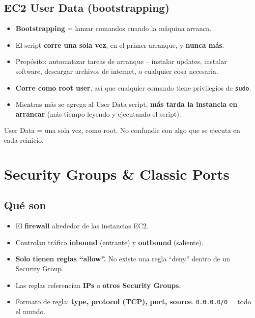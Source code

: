 \documentclass[11pt,a4paper]{article}
\let\oldsection\section
\renewcommand{\section}{\Needspace{9\baselineskip}\oldsection}
\let\oldsubsection\subsection
\renewcommand{\subsection}{\Needspace{6\baselineskip}\oldsubsection}
\newcommand{\cmd}[1]{\texttt{#1}}
\begin{document}
\subsection{EC2 User Data (bootstrapping)}
\begin{itemize}
  \item \textbf{Bootstrapping} = lanzar comandos cuando la máquina arranca.
  \item El script \textbf{corre una sola vez}, en el primer arranque, y \textbf{nunca más}.
  \item Propósito: automatizar tareas de arranque -- instalar updates, instalar software, descargar archivos de internet, o cualquier cosa necesaria.
  \item \textbf{Corre como root user}, así que cualquier comando tiene privilegios de \cmd{sudo}.
  \item Mientras más se agrega al User Data script, \textbf{más tarda la instancia en arrancar} (más tiempo leyendo y ejecutando el script).
\end{itemize}

\begin{truco}[title=Regla rápida]
User Data = una sola vez, como root. No confundir con algo que se ejecuta en cada reinicio.
\end{truco}

\section{Security Groups \& Classic Ports}

\subsection{Qué son}
\begin{itemize}
  \item El \textbf{firewall} alrededor de las instancias EC2.
  \item Controlan tráfico \textbf{inbound} (entrante) y \textbf{outbound} (saliente).
  \item \textbf{Solo tienen reglas ``allow''.} No existe una regla ``deny'' dentro de un Security Group.
  \item Las reglas referencian \textbf{IPs} o \textbf{otros Security Groups}.
  \item Formato de regla: \textbf{type, protocol (TCP), port, source}. \cmd{0.0.0.0/0} = todo el mundo.
\end{itemize}
\end{document}
